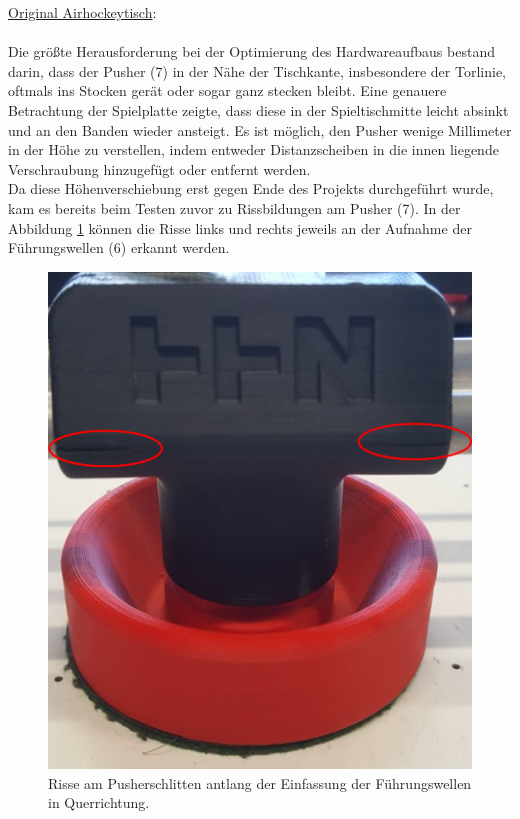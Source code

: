 \underline{Original Airhockeytisch}:\\
\\Die größte Herausforderung bei der Optimierung des Hardwareaufbaus bestand darin, dass der Pusher (7) in der Nähe der Tischkante, insbesondere der Torlinie, oftmals ins Stocken gerät oder sogar ganz stecken bleibt. Eine genauere Betrachtung der Spielplatte zeigte, dass diese in der Spieltischmitte leicht absinkt und an den Banden wieder ansteigt. Es ist möglich, den Pusher wenige Millimeter in der Höhe zu verstellen, indem entweder Distanzscheiben in die innen liegende Verschraubung hinzugefügt oder entfernt werden.\\ Da diese Höhenverschiebung erst gegen Ende des Projekts durchgeführt wurde, kam es bereits beim Testen zuvor zu Rissbildungen am Pusher (7). In der Abbildung \ref{HW_Pusher} können die Risse links und rechts jeweils an der Aufnahme der Führungswellen (6) erkannt werden. \\
\begin{figure} [h]

\begin{minipage}[t]{0.6\textwidth}
\vspace{0pt}
\includegraphics[width=\textwidth]{images/HW_Pusher}
\caption{Risse am Pusherschlitten antlang der Einfassung der Führungswellen in Querrichtung.\\}
\label{HW_Pusher}

\end{minipage}
\end{figure}
\clearpage


